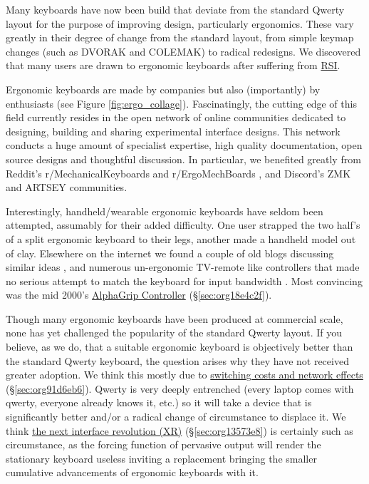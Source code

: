 \documentclass[logo,bsc,singlespacing,parskip]{infthesis}
\begin{document}
Many keyboards have now been build that deviate from the standard Qwerty layout for the purpose of improving design, particularly ergonomics.
These vary greatly in their degree of change from the standard layout, from simple keymap changes (such as DVORAK and COLEMAK) to radical redesigns.
We discovered that many users are drawn to ergonomic keyboards after suffering from \hyperref[orgdb95c62]{RSI}.

Ergonomic keyboards are made by companies but also (importantly) by enthusiasts (see Figure \ref{fig:ergo_collage}).
Fascinatingly, the cutting edge of this field currently resides in the open network of online communities dedicated to designing, building and sharing  experimental interface designs.
This network conducts a huge amount of specialist expertise, high quality documentation, open source designs and thoughtful discussion.
In particular, we benefited greatly from Reddit's r/MechanicalKeyboards \autocite{MechanicalKeyboardsAllClick} and  r/ErgoMechBoards \autocite{ErgoMechBoards} , and Discord's ZMK and ARTSEY communities.

Interestingly, handheld/wearable ergonomic keyboards have seldom been attempted, assumably for their added difficulty.
One user strapped the two half's of a split ergonomic keyboard to their legs, another made a handheld model out of clay.
Elsewhere on the internet we found a couple of old blogs discussing similar ideas \autocite{ChorditeAnotherOnehand}, and numerous un-ergonomic TV-remote like controllers that made no serious attempt to match the keyboard for input bandwidth \autocite{TwiddlerTekGear} .
Most convincing was the mid 2000's \hyperref[sec:org18e4c2f]{AlphaGrip Controller} (\S \ref{sec:org18e4c2f}).

Though many ergonomic keyboards have been produced at commercial scale, none has yet challenged the popularity of the standard Qwerty layout.
If you believe, as we do, that a suitable ergonomic keyboard is objectively better than the standard Qwerty keyboard, the question arises why they have not received greater adoption.
We think this mostly due to \hyperref[sec:org91d6eb6]{switching costs and network effects} (\S \ref{sec:org91d6eb6}).
Qwerty is very deeply entrenched (every laptop comes with qwerty, everyone already knows it, etc.) so it will take a device that is significantly better and/or a radical change of circumstance to displace it.
We think \hyperref[sec:org13573e8]{the next interface revolution (XR)} (\S \ref{sec:org13573e8}) is certainly such as circumstance, as the forcing function of pervasive output will render the stationary keyboard useless inviting a replacement bringing the smaller cumulative advancements of ergonomic keyboards with it.
\end{document}
